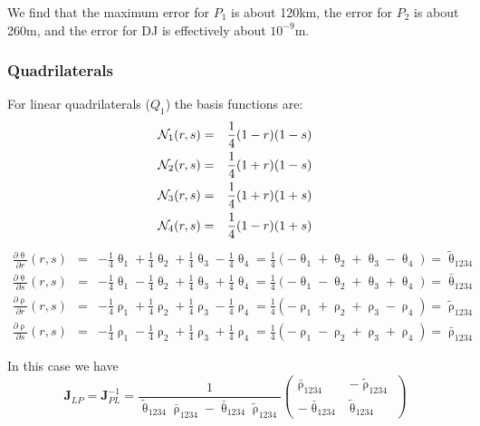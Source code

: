 We find that the maximum error for $P_1$ is about 120km, the error for $P_2$ is about 260m, 
and the error for DJ is effectively about $10^{-9}$m.




\subsubsection{Quadrilaterals}


For linear quadrilaterals ($Q_1$) the basis functions are: 
\begin{eqnarray}
{\mathcal{N}}_1(r,s)&=& \frac14(1-r)(1-s)\\
{\mathcal{N}}_2(r,s)&=& \frac14(1+r)(1-s)\\
{\mathcal{N}}_3(r,s)&=& \frac14(1+r)(1+s)\\
{\mathcal{N}}_4(r,s)&=& \frac14(1-r)(1+s)
\end{eqnarray}
\begin{eqnarray}
\frac{\partial\uptheta}{\partial r}(r,s) 
&=& -\frac14 \uptheta_1 + \frac14 \uptheta_2 + \frac14 \uptheta_3 - \frac14 \uptheta_4 
= \frac14 (-\uptheta_1 + \uptheta_2 + \uptheta_3 - \uptheta_4) =\tilde{\uptheta}_{1234}\\
\frac{\partial\uptheta}{\partial s}(r,s) 
&=& -\frac14 \uptheta_1 - \frac14 \uptheta_2 + \frac14 \uptheta_3 + \frac14 \uptheta_4 
= \frac14 (-\uptheta_1 - \uptheta_2 + \uptheta_3 + \uptheta_4) = \bar{\uptheta}_{1234}\\
\frac{\partial\uprho}{\partial r}(r,s)   
&=& -\frac14 \uprho_1 + \frac14 \uprho_2 + \frac14 \uprho_3 - \frac14 \uprho_4 
= \frac14 (-\uprho_1 + \uprho_2 + \uprho_3 - \uprho_4) = \tilde{\uprho}_{1234}\\
\frac{\partial\uprho}{\partial s}(r,s)   
&=& -\frac14 \uprho_1 - \frac14 \uprho_2 + \frac14 \uprho_3 + \frac14 \uprho_4 
= \frac14 (-\uprho_1 - \uprho_2 + \uprho_3 + \uprho_4) = \bar{\uprho}_{1234}
\end{eqnarray}

In this case we have 
\begin{equation}
\boxed{
{\bm J}_{LP}={\bm J}_{PL}^{-1} = \frac{1}{ \tilde{\uptheta}_{1234} \bar{\uprho}_{1234} - \bar{\uptheta}_{1234} \tilde{\uprho}_{1234} } 
\left(
\begin{array}{cc}
\bar{\uprho}_{1234} & -\tilde{\uprho}_{1234} \\
-\bar{\uptheta}_{1234} & \tilde{\uptheta}_{1234}
\end{array}
\right)}
\end{equation}



